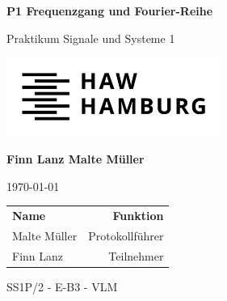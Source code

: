 \documentclass[12pt]{scrreprt}
\begin{document}
\begin{titlepage}
	
	
	\centering
	\begin{figure}
		\vspace*{1cm}	
	\end{figure}
	
	
	{\huge\bfseries P1 Frequenzgang und Fourier-Reihe\par}
	
	\vspace{1cm}
	
	{\LARGE Praktikum Signale und Systeme 1\par}
	
	\vspace{1.5cm}
	
	\includegraphics[width=7cm]{img/HAW_logo_black.png}\par
	\vspace{1.5cm}
	
	
	{\large \bfseries Finn Lanz \hspace{0.8cm} Malte Müller\par}
	
	\vspace{1.5cm}

	{\large \today\par}

	\vspace{3cm}

	\begin{tabular}{lr}
		\rule[-1ex]{0pt}{2.5ex} \textbf{Name} \hspace{2cm} & \textbf{Funktion }\\ 
		\rule[-1ex]{0pt}{2.5ex} Malte Müller & Protokollführer \\ 
		\rule[-1ex]{0pt}{2.5ex} Finn Lanz & Teilnehmer \\ 	
	\end{tabular} 

	\vfill
	{SS1P/2 - E-B3 - VLM} 
	\vspace{2cm}
	

		
	
\end{titlepage}

\tableofcontents
\thispagestyle{fancy}




\end{document}

